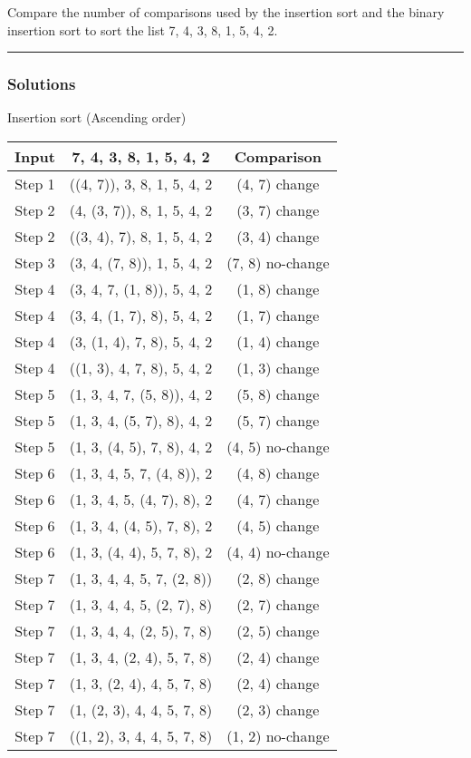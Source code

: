 \newpage
\begin{question}
Compare the number of comparisons used by the insertion sort and the binary insertion sort to sort the list 7, 4, 3, 8, 1, 5, 4, 2.
\end{question}

\par\noindent\rule{\textwidth}{0.5pt}

\subsubsection*{Solutions}

Insertion sort (Ascending order)
\smallskip

\begin{tabular}{|c|c|c|}
    \hline
    Input & 7, 4, 3, 8, 1, 5, 4, 2& Comparison \\
    \hline
    Step 1& ((4, 7)), 3, 8, 1, 5, 4, 2& (4, 7) change \\
    \hline
    Step 2& (4, (3, 7)), 8, 1, 5, 4, 2& (3, 7) change\\
    Step 2& ((3, 4), 7), 8, 1, 5, 4, 2& (3, 4) change\\
    \hline
    Step 3& (3, 4, (7, 8)), 1, 5, 4, 2& (7, 8) no-change\\
    \hline
    Step 4& (3, 4, 7, (1, 8)), 5, 4, 2& (1, 8) change\\
    Step 4& (3, 4, (1, 7), 8), 5, 4, 2& (1, 7) change\\
    Step 4& (3, (1, 4), 7, 8), 5, 4, 2& (1, 4) change\\
    Step 4& ((1, 3), 4, 7, 8), 5, 4, 2& (1, 3) change\\
    \hline
    Step 5& (1, 3, 4, 7, (5, 8)), 4, 2& (5, 8) change\\
    Step 5& (1, 3, 4, (5, 7), 8), 4, 2& (5, 7) change\\
    Step 5& (1, 3, (4, 5), 7, 8), 4, 2& (4, 5) no-change\\
    \hline
    Step 6& (1, 3, 4, 5, 7, (4, 8)), 2& (4, 8) change\\
    Step 6& (1, 3, 4, 5, (4, 7), 8), 2& (4, 7) change\\
    Step 6& (1, 3, 4, (4, 5), 7, 8), 2& (4, 5) change\\
    Step 6& (1, 3, (4, 4), 5, 7, 8), 2& (4, 4) no-change\\
    \hline
    Step 7& (1, 3, 4, 4, 5, 7, (2, 8))& (2, 8) change\\
    Step 7& (1, 3, 4, 4, 5, (2, 7), 8)& (2, 7) change\\
    Step 7& (1, 3, 4, 4, (2, 5), 7, 8)& (2, 5) change\\
    Step 7& (1, 3, 4, (2, 4), 5, 7, 8)& (2, 4) change\\
    Step 7& (1, 3, (2, 4), 4, 5, 7, 8)& (2, 4) change\\
    Step 7& (1, (2, 3), 4, 4, 5, 7, 8)& (2, 3) change\\
    Step 7& ((1, 2), 3, 4, 4, 5, 7, 8)& (1, 2) no-change\\
    \hline
\end{tabular}

